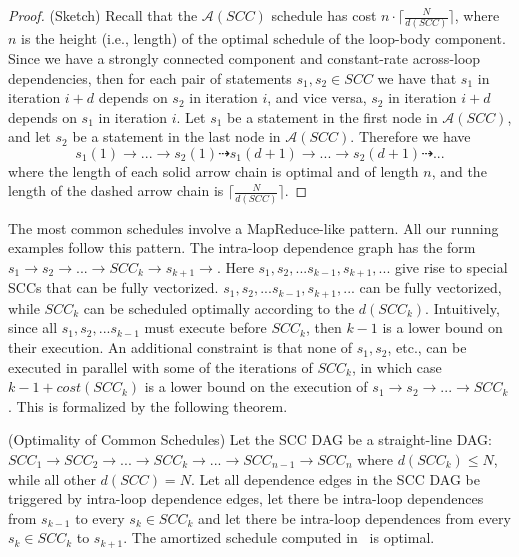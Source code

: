 \begin{proof} (Sketch)
Recall that the $\mathcal{A}(SCC)$ schedule has cost $n \cdot \lceil{\frac{N}{d(\mathit{SCC})}}\rceil$, where $n$ is the height (i.e., length) of the optimal 
schedule of the loop-body component. Since we have a strongly connected component and constant-rate across-loop dependencies, 
then for each pair of statements $s_1, s_2 \in SCC$ 
we have that $s_1$ in iteration $i+d$ depends on $s_2$ in iteration $i$, and vice versa,  $s_2$ in iteration $i+d$ depends on $s_1$ in iteration $i$.
Let $s_1$ be a statement in the first node in $\mathcal{A}(SCC)$, and let $s_2$ be a statement in the last node in $\mathcal{A}(SCC)$. 
Therefore we have
\[s_1 (1) \rightarrow ... \rightarrow s_2 (1) \dasharrow s_1(d+1) \rightarrow ... \rightarrow s_2 (d+1) \dasharrow ...\]
where the length of each solid arrow chain is optimal and of length $n$, and the length of the dashed arrow chain is $\lceil{\frac{N}{d(\mathit{SCC})}}\rceil$.
\end{proof}


The most common schedules involve a MapReduce-like pattern. All our running examples follow this pattern. The intra-loop dependence graph has the form $s_1 \rightarrow s_2 \rightarrow ... \rightarrow \mathit{SCC}_k \rightarrow s_{k+1} \rightarrow $. Here $s_1, s_2, ... s_{k-1}, s_{k+1},...$ give rise to special SCCs that can be fully vectorized. $s_1, s_2, ... s_{k-1}, s_{k+1}, ... $ can be fully vectorized, while $\mathit{SCC}_k$ can be scheduled optimally according to the $d(\mathit{SCC}_k)$. Intuitively, since all $s_1, s_2, ...s_{k-1}$ must execute before $\mathit{SCC}_k$, then ${k-1}$ is a lower bound on their execution. An additional constraint is that none of $s_1, s_2$, etc., can be executed in parallel with some of the iterations of $\mathit{SCC}_k$, in which case ${k-1} + \mathit{cost}(\mathit{SCC}_k)$ is a lower bound on the execution of $s_1 \rightarrow s_2 \rightarrow ... \rightarrow \mathit{SCC}_k$. 
This is formalized by the following theorem.

\begin{theorem}(Optimality of Common Schedules) Let the SCC DAG be a straight-line DAG: $\mathit{SCC}_1 \rightarrow \mathit{SCC}_2 \rightarrow ... \rightarrow \mathit{SCC}_k \rightarrow
... \rightarrow \mathit{SCC}_{n-1} \rightarrow \mathit{SCC}_n$ where $d(\mathit{SCC}_k) \le N$, while all other $d(\mathit{SCC})=N$. Let all dependence edges in the SCC DAG be triggered by intra-loop dependence edges, let there be intra-loop dependences from $s_{k-1}$ to every $s_k \in \mathit{SCC}_k$ and let there be intra-loop dependences from every $s_k \in \mathit{SCC}_k$ to $s_{k+1}$. The amortized schedule computed in~ is optimal. %
\end{theorem}

